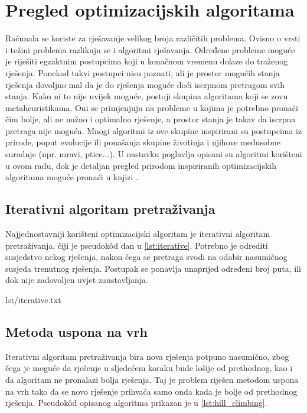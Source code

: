\chapter{Pregled optimizacijskih algoritama}
Računala se koriste za rješavanje velikog broja različitih problema.
Ovisno o vrsti i težini problema razlikuju se i algoritmi rješavanja.
Određene probleme moguće je riješiti egzaktnim postupcima koji u konačnom vremenu dolaze do traženog rješenja.
Ponekad takvi postupci nisu poznati, ali je prostor mogućih stanja rješenja dovoljno mal da je do rješenja moguće doći iscrpnom pretragom svih stanja.
Kako ni to nije uvijek moguće, postoji skupina algoritama koji se zovu metaheuristikama.
Oni se primjenjuju na probleme u kojima je potrebno pronaći čim bolje, ali ne nužno i optimalno rješenje, a prostor stanja je takav da iscrpna pretraga nije moguća.
Mnogi algoritmi iz ove skupine inspirirani su postupcima iz prirode, poput evolucije ili ponašanja skupine životinja i njihove međusobne suradnje (npr. mravi, ptice...).
U nastavku poglavlja opisani su algoritmi korišteni u ovom radu, dok je detaljan pregled prirodom inspiriranih optimizacijskih algoritama moguće pronaći u knjizi \cite{PrirodomInspirirani}.


\section{Iterativni algoritam pretraživanja}
Najjednostavniji korišteni optimizacijski algoritam je iterativni algoritam pretraživanja, čiji je pseudok\^{o}d dan u \ref{lst:iterative}.
Potrebno je odrediti susjedstvo nekog rješenja, nakon čega se pretraga svodi na odabir nasumičnog susjeda trenutnog rješenja.
Postupak se ponavlja unaprijed određeni broj puta, ili dok nije zadovoljen uvjet zaustavljanja.

\begin{minipage}{0.95\textwidth}
     {lst/iterative.txt}
\end{minipage}


\section{Metoda uspona na vrh}
Iterativni algoritam pretraživanja bira nova rješenja potpuno nasumično, zbog čega je moguće da rješenje u sljedećem koraku bude lošije od prethodnog, kao i da algoritam ne pronalazi bolja rješenja.
Taj je problem riješen metodom uspona na vrh tako da se novo rješenje prihvaća samo onda kada je bolje od prethodnog rješenja.
Pseudok\^{o}d opisanog algoritma prikazan je u \ref{lst:hill_climbing}.

